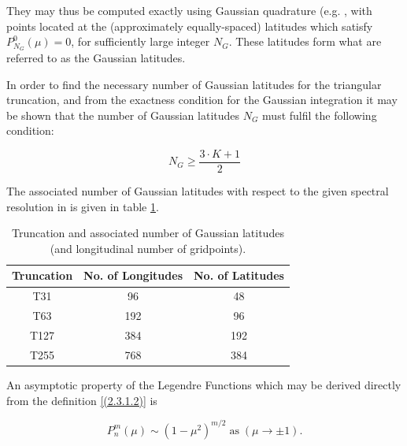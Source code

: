 They may thus be computed exactly using Gaussian quadrature
(e.g. \cite{krylov62}, with points located at the (approximately
equally-spaced) latitudes which satisfy $P^0_{N_G}(\mu) = 0$, for
sufficiently large integer $N_G$. These latitudes form what are referred to
as the Gaussian latitudes.

In order to find the necessary number of Gaussian latitudes for the
triangular truncation, and from the exactness condition for the
Gaussian integration it may be shown that the number of Gaussian
latitudes $N_G$ must fulfil the following condition:

\begin{equation}
N_G\geq\frac{3\cdot K+1}{2} \nonumber
\end{equation}

The associated number of Gaussian latitudes with respect to the given
spectral resolution in \echam{}
is
given in table \ref{tab:Gaus}.

\begin{table}[htb]
\begin{center}
\begin{tabular}{ccc}\hline
Truncation & No. of Longitudes & No. of Latitudes \\ \hline
T31        &      96           &        48        \\
T63        &     192           &        96        \\ 
T127       &     384           &       192        \\
T255       &     768           &       384        \\ \hline
\end{tabular}
\end{center}
\caption[Truncation and associated number of Gaussian latitudes]{Truncation and associated number of Gaussian latitudes (and longitudinal number of gridpoints).\label{tab:Gaus}}   
\end{table}

An asymptotic property of the Legendre Functions which may be derived
directly from the definition \ref{(2.3.1.2)} is

\begin{equation}
P^m_n(\mu) \sim (1 - \mu^2)^{m/2} \; \mbox{as} \; (\mu\rightarrow\pm1).\nonumber
\end{equation}

